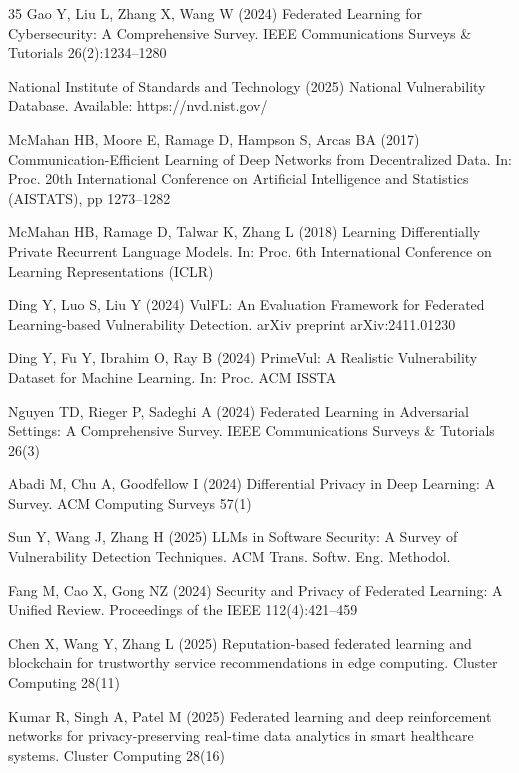 \documentclass[pdflatex,sn-mathphys-num]{sn-jnl}
\theoremstyle{thmstyleone}%
\theoremstyle{thmstyletwo}%
\theoremstyle{thmstylethree}%
\begin{document}
\begin{thebibliography}{35}
Gao Y, Liu L, Zhang X, Wang W (2024) Federated Learning for Cybersecurity: A Comprehensive Survey. IEEE Communications Surveys \& Tutorials 26(2):1234--1280

National Institute of Standards and Technology (2025) National Vulnerability Database. Available: https://nvd.nist.gov/

McMahan HB, Moore E, Ramage D, Hampson S, Arcas BA (2017) Communication-Efficient Learning of Deep Networks from Decentralized Data. In: Proc. 20th International Conference on Artificial Intelligence and Statistics (AISTATS), pp 1273--1282

McMahan HB, Ramage D, Talwar K, Zhang L (2018) Learning Differentially Private Recurrent Language Models. In: Proc. 6th International Conference on Learning Representations (ICLR)

Ding Y, Luo S, Liu Y (2024) VulFL: An Evaluation Framework for Federated Learning-based Vulnerability Detection. arXiv preprint arXiv:2411.01230

Ding Y, Fu Y, Ibrahim O, Ray B (2024) PrimeVul: A Realistic Vulnerability Dataset for Machine Learning. In: Proc. ACM ISSTA

Nguyen TD, Rieger P, Sadeghi A (2024) Federated Learning in Adversarial Settings: A Comprehensive Survey. IEEE Communications Surveys \& Tutorials 26(3)

Abadi M, Chu A, Goodfellow I (2024) Differential Privacy in Deep Learning: A Survey. ACM Computing Surveys 57(1)

Sun Y, Wang J, Zhang H (2025) LLMs in Software Security: A Survey of Vulnerability Detection Techniques. ACM Trans. Softw. Eng. Methodol.

Fang M, Cao X, Gong NZ (2024) Security and Privacy of Federated Learning: A Unified Review. Proceedings of the IEEE 112(4):421--459

Chen X, Wang Y, Zhang L (2025) Reputation-based federated learning and blockchain for trustworthy service recommendations in edge computing. Cluster Computing 28(11)

Kumar R, Singh A, Patel M (2025) Federated learning and deep reinforcement networks for privacy-preserving real-time data analytics in smart healthcare systems. Cluster Computing 28(16)


\end{thebibliography}
\end{document}
